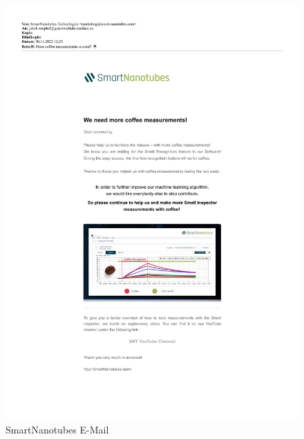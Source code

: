 \documentclass[10pt]{article}
\begin{document}
\begin{figure}[H]
\centering
\includegraphics[scale=0.26]{Bilder/E-Mail-NanoTubes.jpg}
\caption{SmartNanotubes E-Mail}
\end{figure}
\end{document}

